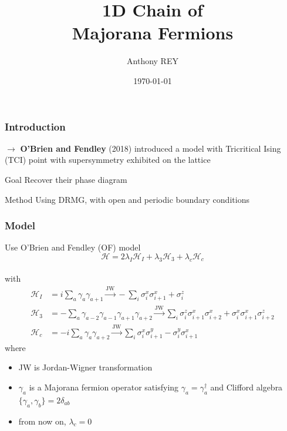 \documentclass[10pt]{beamer}
\title{1D Chain of \\Majorana Fermions}
\author{Anthony REY}
\institute{\'Ecole Polytechnique Fédérale de Lausanne}
\date{\today}
\begin{document}

\frame{\titlepage}

\begin{frame}
    \frametitle{Introduction}

    $\longrightarrow$ \textbf{O'Brien and Fendley} (2018) introduced a model with Tricritical Ising (TCI) point with supersymmetry exhibited on the lattice
    \vspace{1cm}

    \pause
    \begin{block}{Goal}
        Recover their phase diagram 
    \end{block}
    
    \pause
    \begin{block}{Method}
        Using DRMG, with open and periodic boundary conditions
    \end{block}

\end{frame}

\begin{frame}
    \frametitle{Model}
    
    Use O'Brien and Fendley (OF) model
    $$\mathcal{H} = 2\lambda_I \mathcal{H}_I + \lambda_3 \mathcal{H}_3 + \lambda_c \mathcal{H}_c$$\\
    with $$\begin{aligned} \mathcal{H}_I &= i \sum_a \gamma_a\gamma_{a+1} \xrightarrow{\text{JW}} -\sum_i \sigma^x_i\sigma^x_{i+1} + \sigma^z_i \\ \mathcal{H}_3 &= - \sum_a \gamma_{a-2}\gamma_{a-1}\gamma_{a+1}\gamma_{a+2} \xrightarrow{\text{JW}} \sum_i \sigma^z_i\sigma^x_{i+1}\sigma^x_{i+2} + \sigma^x_i\sigma^x_{i+1}\sigma^z_{i+2} \\ \mathcal{H}_c &= -i \sum_a \gamma_a\gamma_{a+2} \xrightarrow{\text{JW}} \sum_i \sigma^x_i\sigma^y_{i+1} - \sigma^y_i\sigma^x_{i+1} \end{aligned}$$
    where 
    \begin{itemize}
        \item JW is Jordan-Wigner transformation
        \item $\gamma_a$ is a Majorana fermion operator satisfying $\gamma_a = \gamma_a^\dagger$ and Clifford algebra $\{\gamma_a, \gamma_b\} = 2\delta_{ab}$
        \item from now on, $\lambda_c=0$
    \end{itemize}
\end{frame}
\end{document}
